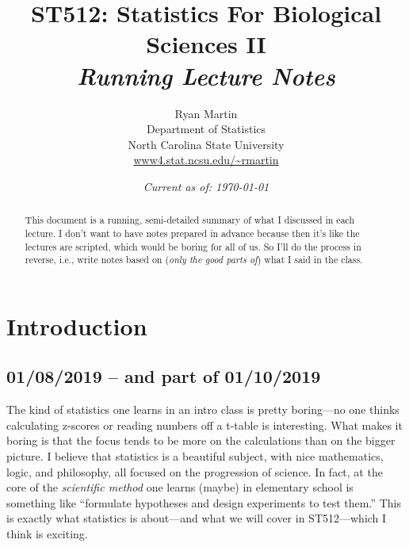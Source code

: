 \documentclass[a4paper, 12pt]{article}
\title{ST512: Statistics For Biological Sciences II \\ {\em Running Lecture Notes}}
\author{
Ryan Martin \\
Department of Statistics \\
North Carolina State University \\
\url{www4.stat.ncsu.edu/~rmartin} 
}
\date{{\color{blue} {\em Current as of: \today}}}
\theoremstyle{plain}
\theoremstyle{definition}
\theoremstyle{remark}
\begin{document}
\maketitle

\begin{abstract}
This document is a running, semi-detailed summary of what I discussed in each lecture.  I don't want to have notes prepared in advance because then it's like the lectures are scripted, which would be boring for all of us. So I'll do the process in reverse, i.e., write notes based on ({\em only the good parts of}) what I said in the class. 
\end{abstract}

\tableofcontents



\pagebreak


\section{Introduction}

\subsection*{01/08/2019 -- and part of 01/10/2019}

The kind of statistics one learns in an intro class is pretty boring---no one thinks calculating z-scores or reading numbers off a t-table is interesting.  What makes it boring is that the focus tends to be more on the calculations than on the bigger picture.  I believe that statistics is a beautiful subject, with nice mathematics, logic, and philosophy, all focused on the progression of science.  In fact, at the core of the {\em scientific method} one learns (maybe) in elementary school is something like ``formulate hypotheses and design experiments to test them.''  This is exactly what statistics is about---and what we will cover in ST512---which I think is exciting.  
\end{document}
